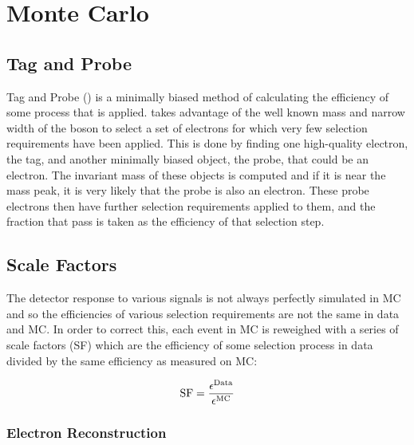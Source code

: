 \chapter{Monte Carlo}
\label{chatper:monte_carlo}

\section{Tag and Probe}

Tag and Probe (\TnP) is a minimally biased method of calculating the efficiency
of some process that is applied. \TnP takes advantage of the well known mass
and narrow width of the \Z boson to select a set of electrons for which very
few selection requirements have been applied. This is done by finding one
high-quality electron, the tag, and another minimally biased object, the probe,
that could be an electron. The invariant mass of these objects is computed and
if it is near the \Z mass peak, it is very likely that the probe is also an
electron. These probe electrons then have further selection requirements
applied to them, and the fraction that pass is taken as the efficiency of that
selection step.

\section{Scale Factors}

The detector response to various signals is not always perfectly simulated in
MC and so the efficiencies of various selection requirements are not the same
in data and MC. In order to correct this, each event in MC is reweighed with a
series of scale factors (SF) which are the efficiency of some selection process
in data divided by the same efficiency as measured on MC:

\begin{equation}
    \label{eq:sf}
    \text{SF} = \frac{\epsilon^{\text{Data}}}{\epsilon^{\text{MC}}}
\end{equation}

\subsection{Electron Reconstruction}

